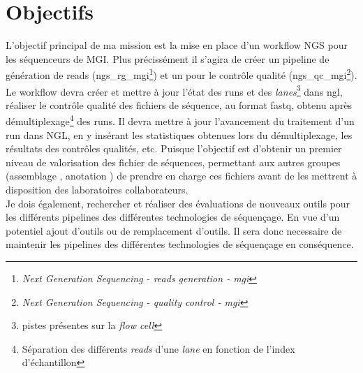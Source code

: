 \section{Objectifs}
L'objectif principal de ma mission est la mise en place d'un workflow NGS pour les séquenceurs de MGI. Plus précissément il s'agira de créer un pipeline de génération de reads (ngs\_rg\_mgi\footnote{\emph{Next Generation Sequencing - reads generation - mgi}}) et un pour le contrôle qualité (ngs\_qc\_mgi\footnote{\emph{Next Generation Sequencing - quality control - mgi}}). Le workflow devra créer et mettre à jour l'état des runs et des \emph{lanes}\footnote{pistes présentes sur la \emph{flow cell}} dans ngl, réaliser le contrôle qualité des fichiers de séquence, au format fastq, obtenu après démultiplexage\footnote{Séparation des différents \emph{reads} d'une \emph{lane} en fonction de l'index d'échantillon} des runs. Il devra mettre à jour l'avancement du traitement d'un run dans NGL, en y insérant les statistiques obtenues lors du démultiplexage, les résultats des contrôles qualités, etc. Puisque l'objectif est d'obtenir un premier niveau de valorisation des fichier de séquences, permettant aux autres groupes (\og assemblage \fg{}, \og anotation \fg{}) de prendre en charge ces fichiers avant de les mettrent à disposition des laboratoires collaborateurs.\\

Je dois également, rechercher et réaliser des évaluations de nouveaux outils pour les différents pipelines des différentes technologies de séquençage. En vue d'un potentiel ajout d'outils ou de remplacement d'outils. Il sera donc necessaire de maintenir les pipelines des différentes technologies de séquençage en conséquence.